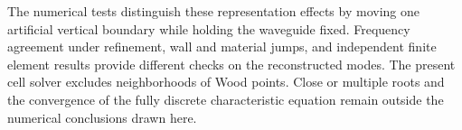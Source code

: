 \documentclass[review,hidelinks,onefignum,onetabnum]{siamart251216}
\begin{document}
The numerical tests distinguish these representation effects by moving one
artificial vertical boundary while holding the waveguide fixed. Frequency
agreement under refinement, wall and material jumps, and independent finite
element results provide different checks on the reconstructed modes.
The present cell solver excludes neighborhoods of Wood points. Close or
multiple roots and the convergence of the fully discrete characteristic
equation remain outside the numerical conclusions drawn here.




\end{document}
